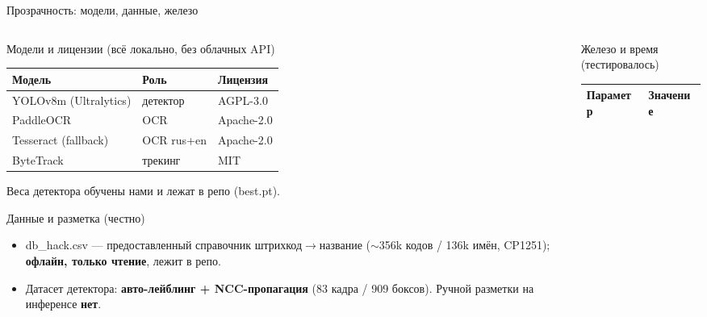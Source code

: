 \documentclass[aspectratio=169,10pt]{beamer}
\newcommand{\code}[1]{{\ttfamily\small\color{slate}#1}}
\newcommand{\hl}[1]{{\bfseries\color{accent}#1}}
\newcommand{\hr}[1]{{\bfseries\color{redtag}#1}}
\begin{document}
\begin{frame}{Прозрачность: модели, данные, железо}
  \begin{columns}[T,onlytextwidth]
    \begin{column}{0.49\textwidth}
      \begin{block}{Модели и лицензии (всё локально, без облачных API)}\footnotesize
        \setlength{\tabcolsep}{4pt}\renewcommand{\arraystretch}{1.12}
        \begin{tabular}{@{}lll@{}}\toprule
          \textbf{Модель} & \textbf{Роль} & \textbf{Лицензия}\\ \midrule
          YOLOv8m (Ultralytics) & детектор   & \code{AGPL-3.0}\\
          PaddleOCR             & OCR        & \code{Apache-2.0}\\
          Tesseract (fallback)  & OCR rus+en & \code{Apache-2.0}\\
          ByteTrack             & трекинг    & \code{MIT}\\ \bottomrule
        \end{tabular}
        \vspace{0.25em}
        {\scriptsize\color{slate} Веса детектора обучены нами и лежат в репо (\code{best.pt}).}
      \end{block}
      \vspace{0.35em}
      \begin{block}{Данные и разметка (честно)}\footnotesize
        \begin{itemize}\setlength\itemsep{1pt}
          \item \code{db\_hack.csv} — предоставленный справочник штрихкод$\to$название ($\sim$356k кодов / 136k имён, CP1251); \hl{офлайн, только чтение}, лежит в репо.
          \item Датасет детектора: \hl{авто-лейблинг + NCC-пропагация} (83 кадра / 909 боксов). Ручной разметки на инференсе \hr{нет}.
        \end{itemize}
      \end{block}
    \end{column}
    \begin{column}{0.49\textwidth}
      \begin{block}{Железо и время (тестировалось)}\footnotesize
        \setlength{\tabcolsep}{4pt}\renewcommand{\arraystretch}{1.12}
        \begin{tabular}{@{}p{2.5cm}p{5.4cm}@{}}\toprule
          \textbf{Параметр} & \textbf{Значение}\\ \midrule

\end{tabular}
\end{block}
\end{column}
\end{columns}
\end{frame}
\end{document}
